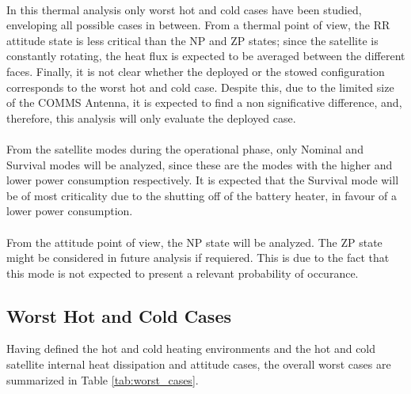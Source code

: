 \paragraph{}

In this thermal analysis only worst hot and cold cases have been studied, enveloping all possible cases in between.
From a thermal point of view, the RR attitude state is less critical than the NP and ZP states; since the satellite
is constantly rotating, the heat flux is expected to be averaged between the different faces.
Finally, it is not clear whether the deployed or the stowed configuration corresponds to the worst hot and cold case. 
Despite this, due to the limited size of the COMMS Antenna, it is expected to find a non significative difference, and,
therefore, this analysis will only evaluate the deployed case.
\paragraph{}
From the satellite modes during the operational phase, only Nominal and Survival modes will be analyzed, since these are the modes 
with the higher and lower power consumption respectively. It is expected that the Survival mode will be of most criticality due to
the shutting off of the battery heater, in favour of a lower power consumption.

\paragraph{}
From the attitude point of view, the NP state will be analyzed. The ZP state might be considered in future analysis if requiered. This is
due to the fact that this mode is not expected to present a relevant probability of occurance.

\subsection{Worst Hot and Cold Cases}

Having defined the hot and cold heating environments and the hot and cold satellite internal heat dissipation and attitude
cases, the overall worst cases are summarized in Table \ref{tab:worst_cases}.

